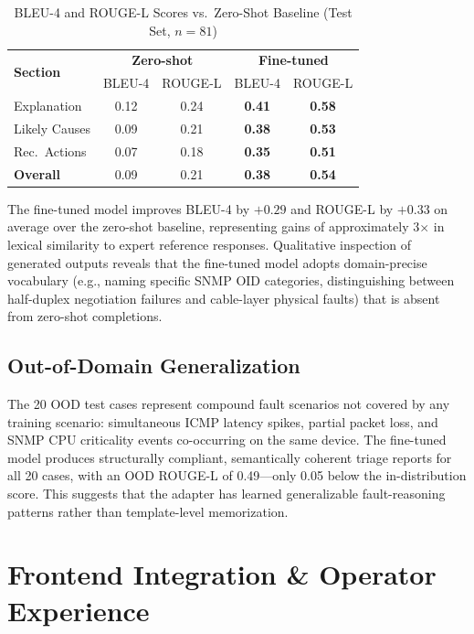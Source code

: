 \documentclass[conference]{IEEEtran}
\begin{document}
\begin{table}[htbp]
\centering
\caption{BLEU-4 and ROUGE-L Scores vs.\ Zero-Shot Baseline (Test Set, $n=81$)}
\label{tab:bleu_rouge}
\begin{tabular}{lcccc}
\toprule
\multirow{2}{*}{\textbf{Section}} & \multicolumn{2}{c}{\textbf{Zero-shot}} & \multicolumn{2}{c}{\textbf{Fine-tuned}} \\
 & BLEU-4 & ROUGE-L & BLEU-4 & ROUGE-L \\
\midrule
Explanation    & 0.12 & 0.24 & \textbf{0.41} & \textbf{0.58} \\
Likely Causes  & 0.09 & 0.21 & \textbf{0.38} & \textbf{0.53} \\
Rec.\ Actions  & 0.07 & 0.18 & \textbf{0.35} & \textbf{0.51} \\
\midrule
\textbf{Overall} & 0.09 & 0.21 & \textbf{0.38} & \textbf{0.54} \\
\bottomrule
\end{tabular}
\end{table}

The fine-tuned model improves BLEU-4 by $+0.29$ and ROUGE-L by $+0.33$ on average over the zero-shot baseline, representing gains of approximately 3$\times$ in lexical similarity to expert reference responses. Qualitative inspection of generated outputs reveals that the fine-tuned model adopts domain-precise vocabulary (e.g., naming specific SNMP OID categories, distinguishing between half-duplex negotiation failures and cable-layer physical faults) that is absent from zero-shot completions.

\subsection{Out-of-Domain Generalization}

The 20 OOD test cases represent compound fault scenarios not covered by any training scenario: simultaneous ICMP latency spikes, partial packet loss, and SNMP CPU criticality events co-occurring on the same device. The fine-tuned model produces structurally compliant, semantically coherent triage reports for all 20 cases, with an OOD ROUGE-L of 0.49---only 0.05 below the in-distribution score. This suggests that the adapter has learned generalizable fault-reasoning patterns rather than template-level memorization.

\section{Frontend Integration \& Operator Experience}
\label{sec:frontend}
\end{document}

